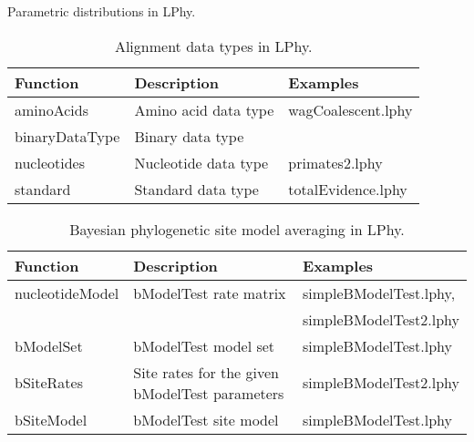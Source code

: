 \documentclass[12pt]{article} %
\begin{document}
\begin{table}
\label{tab:prior}
\caption{Parametric distributions in LPhy.}
\end{table}


\begin{table}
\begin{center}
\small
\begin{tabular}{ l | l | l }
    \hline\hline
    Function & Description & Examples \\ 
    \hline\hline
    aminoAcids & Amino acid data type & wagCoalescent.lphy\\  
    binaryDataType & Binary data type & \\  
    nucleotides & Nucleotide data type & primates2.lphy\\  
    standard & Standard data type & totalEvidence.lphy\\  
    \hline
\end{tabular}
\label{tab:coalescent}
\caption{Alignment data types in LPhy.}
\end{center}
\end{table}


\begin{table}
\small
\begin{tabular}{ l | l | l }
    \hline\hline
    Function & Description & Examples \\ 
    \hline\hline
    nucleotideModel & bModelTest\cite{bouckaert2017bmodeltestcomparison} rate matrix & simpleBModelTest.lphy, \\ & & simpleBModelTest2.lphy\\  
    bModelSet & bModelTest model set & simpleBModelTest.lphy\\  
    bSiteRates & Site rates for the given bModelTest parameters & simpleBModelTest2.lphy\\  
    bSiteModel & bModelTest site model & simpleBModelTest.lphy\\  
        \hline
\end{tabular}
\label{tab:coalescent}
\caption{Bayesian phylogenetic site model averaging in LPhy.}
\end{table}

\clearpage




\end{document}
